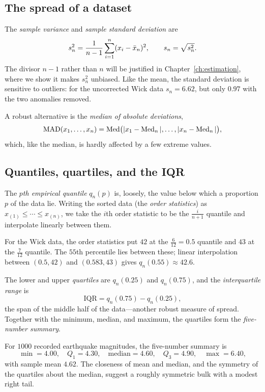 \subsection{The spread of a dataset}

The \emph{sample variance} and \emph{sample standard deviation} are
\[
  s_n^2=\frac{1}{n-1}\sum_{i=1}^n (x_i-\bar{x}_n)^2,\qquad s_n=\sqrt{s_n^2}.
\]
The divisor $n-1$ rather than $n$ will be justified in
Chapter~\ref{ch:estimation}, where we show it makes $s_n^2$ unbiased. Like the
mean, the standard deviation is sensitive to outliers: for the uncorrected Wick
data $s_n=6.62$, but only $0.97$ with the two anomalies removed.

A robust alternative is the \emph{median of absolute deviations},
\[
  \operatorname{MAD}(x_1,\dots,x_n)=\operatorname{Med}\bigl(|x_1-\operatorname{Med}_n|,\dots,|x_n-\operatorname{Med}_n|\bigr),
\]
which, like the median, is hardly affected by a few extreme values.

\subsection{Quantiles, quartiles, and the IQR}

The \emph{$p$th empirical quantile} $q_n(p)$ is, loosely, the value below which a
proportion $p$ of the data lie. Writing the sorted data (the \emph{order
statistics}) as $x_{(1)}\le\cdots\le x_{(n)}$, we take the $i$th order statistic
to be the $\tfrac{i}{n+1}$ quantile and interpolate linearly between them.

\begin{example}
For the Wick data, the order statistics put $42$ at the $\tfrac{6}{12}=0.5$
quantile and $43$ at the $\tfrac{7}{12}$ quantile. The $55$th percentile lies
between these; linear interpolation between $(0.5,42)$ and $(0.583,43)$ gives
$q_n(0.55)\approx 42.6$.
\end{example}

The lower and upper \emph{quartiles} are $q_n(0.25)$ and $q_n(0.75)$, and the
\emph{interquartile range} is
\[
  \mathrm{IQR}=q_n(0.75)-q_n(0.25),
\]
the span of the middle half of the data—another robust measure of spread.
Together with the minimum, median, and maximum, the quartiles form the
\emph{five-number summary}.

\begin{example}
For $1000$ recorded earthquake magnitudes, the five-number summary is
\[
  \min = 4.00,\quad Q_1 = 4.30,\quad \text{median}=4.60,\quad Q_3=4.90,\quad \max=6.40,
\]
with sample mean $4.62$. The closeness of mean and median, and the symmetry of
the quartiles about the median, suggest a roughly symmetric bulk with a modest
right tail.
\end{example}

